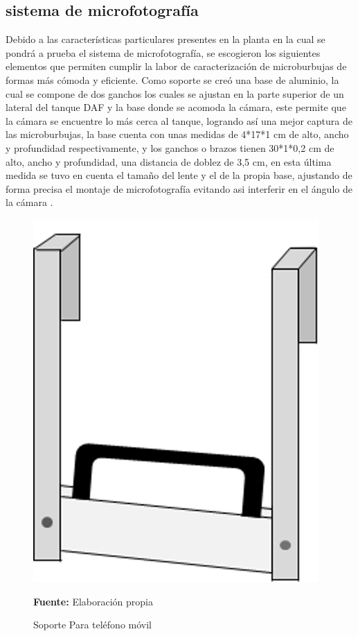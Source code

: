 \documentclass[12pt,twocolumn,a4paper]{article}
\begin{document}
\subsection{sistema de microfotografía }

Debido a las características particulares presentes en la planta en la cual se pondrá a prueba el sistema de microfotografía, se escogieron los siguientes elementos que permiten cumplir la labor de caracterización de microburbujas de formas más cómoda y eficiente. Como soporte se creó una base de aluminio, la cual  se compone de dos ganchos los cuales se ajustan en la parte superior de un lateral del tanque DAF y la base donde se acomoda la cámara, este permite que la cámara se encuentre lo más cerca al tanque, logrando así una mejor captura de las microburbujas, la base cuenta con unas medidas de 4*17*1 cm de alto, ancho y profundidad respectivamente, y los ganchos o brazos tienen   30*1*0,2 cm de alto, ancho y profundidad, una distancia de doblez  de 3,5 cm,  en esta última medida se tuvo en cuenta el tamaño del lente y el de la propia base, ajustando de forma precisa el montaje de microfotografía evitando asi interferir en el ángulo de la cámara \cite{tripode}. 

\begin{figure}
	\centering
	\includegraphics[scale=0.5]{soporte.png}
	\caption{Soporte Para teléfono móvil} \textbf{Fuente:} Elaboración propia
	\label{lente}
\end{figure}
\end{document}

